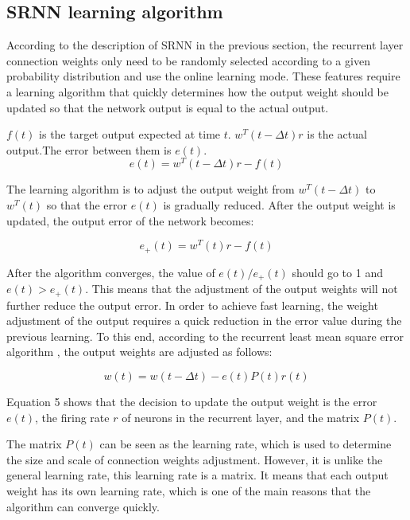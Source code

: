 \documentclass[runningheads]{llncs}
\begin{document}
\subsection{SRNN learning algorithm}
According to the description of SRNN in the previous section, 
the recurrent layer connection weights only need to be randomly 
selected according to a given probability distribution and use the 
online learning mode. These features require a learning algorithm 
that quickly determines how the output weight should be 
updated so that the network output is equal to the actual output.

$f(t)$ is the target output expected at time $t$. $w^T (t-\Delta t) r$ is
the actual output.The error between them is $e(t)$.
\begin{equation}
e(t)= w^T (t -\Delta t)r-f(t)
\end{equation}

The learning algorithm is to adjust the output weight 
from $w^T (t -\Delta t)$ to $w^T (t)$ so that the error $e(t)$ is gradually reduced.
After the output weight is updated, the output error of the network becomes:

\begin{equation}
e_+(t)= w^T (t)r-f(t)
\end{equation}

After the algorithm converges, the value of $e(t)/e_+ (t)$ should go to 1 and $e(t)>e_+(t)$.
This means that the adjustment of the output weights will not further 
reduce the output error. In order to achieve fast learning,
the weight adjustment of the output requires a quick reduction 
in the error value during the previous learning. To this end, 
according to the recurrent least mean square error algorithm \cite{RN23}, 
the output weights are adjusted as follows:

\begin{equation}
w(t)= w(t -\Delta t)  - e(t)P(t)r(t)
\end{equation}

Equation 5 shows that the decision to update the output weight is the 
error $e(t)$, the firing rate $r$ of neurons in  the recurrent layer, 
and the matrix $P(t)$.

The  matrix $P(t)$ can be seen as the learning rate, which is used 
to determine the size and scale of connection weights adjustment. However, it is
unlike the general learning rate, this learning rate is a matrix. 
It means that each output weight has its own learning rate, 
which is one of the main reasons that the algorithm can converge quickly.
\end{document}
